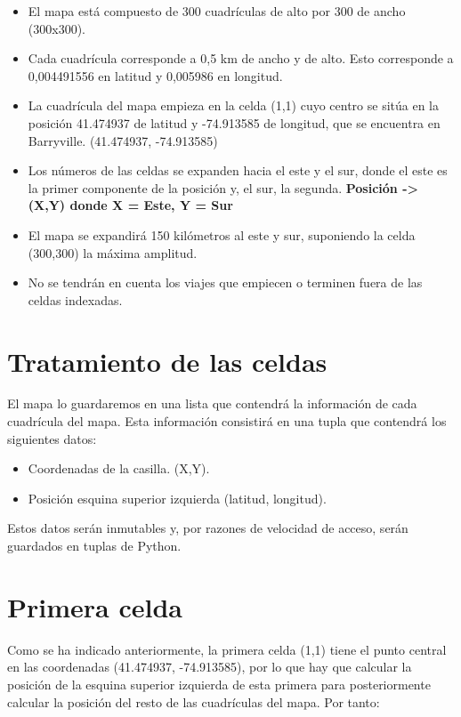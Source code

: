 \begin{itemize}
\item El mapa está compuesto de 300 cuadrículas de alto por 300 de ancho (300x300).
\item Cada cuadrícula corresponde a 0,5 km de ancho y de alto. Esto corresponde a 0,004491556 en latitud y 0,005986 en longitud.
\item La cuadrícula del mapa empieza en la celda (1,1) cuyo centro se sitúa en la posición 41.474937 de latitud y -74.913585 de longitud, que se encuentra en Barryville. (41.474937, -74.913585)
\item Los números de las celdas se expanden hacia el este y el sur, donde el este es la primer componente de la posición y, el sur, la segunda. \textbf{Posición -> (X,Y) donde X = Este, Y = Sur}
\item El mapa se expandirá 150 kilómetros al este y sur, suponiendo la celda (300,300) la máxima amplitud.
\item No se tendrán en cuenta los viajes que empiecen o terminen fuera de las celdas indexadas.
\end{itemize}


\section{Tratamiento de las celdas}

El mapa lo guardaremos en una lista que contendrá la información de cada cuadrícula del mapa. Esta información consistirá en una tupla que contendrá los siguientes datos:

\begin{itemize}
\item Coordenadas de la casilla. (X,Y).
\item Posición esquina superior izquierda (latitud, longitud).
\end{itemize}

Estos datos serán inmutables y, por razones de velocidad de acceso, serán guardados en tuplas de Python.

\section{Primera celda}

Como se ha indicado anteriormente, la primera celda (1,1) tiene el punto central en las coordenadas (41.474937, -74.913585), por lo que hay que calcular la posición de la esquina superior izquierda de esta primera para posteriormente calcular la posición del resto de las cuadrículas del mapa. Por tanto:

